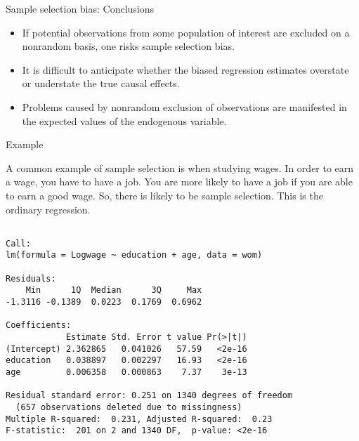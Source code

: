 \documentclass[10pt,ignorenonframetext,]{beamer}
\providecommand{\tightlist}{%
\setlength{\itemsep}{0pt}\setlength{\parskip}{0pt}}
\begin{document}
\begin{frame}{Sample selection bias: Conclusions}

\begin{itemize}
\tightlist
\item
  If potential observations from some population of interest are
  excluded on a nonrandom basis, one risks sample selection bias.
\item
  It is difficult to anticipate whether the biased regression estimates
  overstate or understate the true causal effects.
\item
  Problems caused by nonrandom exclusion of observations are manifested
  in the expected values of the endogenous variable.
\end{itemize}

\end{frame}

\begin{frame}[fragile]{Example}

\scriptsize
A common example of sample selection is when studying wages. In order to
earn a wage, you have to have a job. You are more likely to have a job
if you are able to earn a good wage. So, there is likely to be sample
selection. This is the ordinary regression.

\begin{verbatim}

Call:
lm(formula = Logwage ~ education + age, data = wom)

Residuals:
    Min      1Q  Median      3Q     Max 
-1.3116 -0.1389  0.0223  0.1769  0.6962 

Coefficients:
            Estimate Std. Error t value Pr(>|t|)
(Intercept) 2.362865   0.041026   57.59   <2e-16
education   0.038897   0.002297   16.93   <2e-16
age         0.006358   0.000863    7.37    3e-13

Residual standard error: 0.251 on 1340 degrees of freedom
  (657 observations deleted due to missingness)
Multiple R-squared:  0.231, Adjusted R-squared:  0.23 
F-statistic:  201 on 2 and 1340 DF,  p-value: <2e-16
\end{verbatim}

\end{frame}
\end{document}

